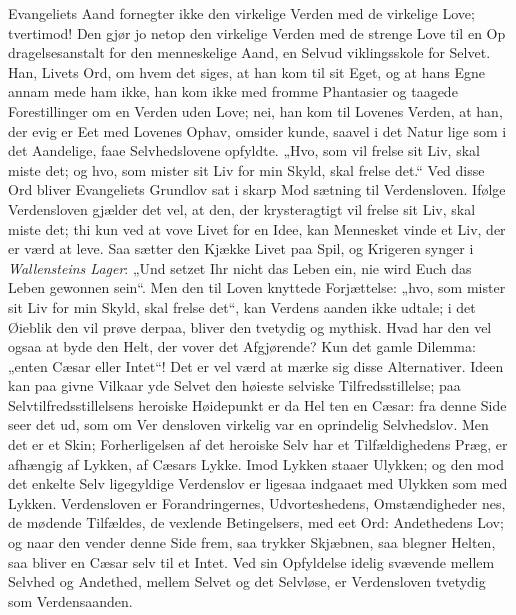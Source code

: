 \documentclass[12pt]{book}
\newcommand{\opage}[1]{\marginnote{\footnotesize\textit{[#1]}}}
\begin{document}
Evangeliets Aand fornegter ikke den virkelige Verden
med de virkelige Love; tvertimod! Den gjør jo netop
den virkelige Verden med de strenge Love til en Op\-%
dragelsesanstalt for den menneskelige Aand, en Selvud\-%
viklingsskole for Selvet. Han, Livets Ord, om hvem det
siges, at han kom til sit Eget, og at hans Egne annam\-%
mede ham ikke, han kom ikke med fromme Phantasier
og taagede Forestillinger om en Verden uden Love; nei,
\opage{44}\setcounter{footnote}{0}%
han kom til Lovenes Verden, at han, der evig er Eet
med Lovenes Ophav, omsider kunde, saavel i det Natur\-%
lige som i det Aandelige, faae Selvhedslovene opfyldte.
„Hvo, som vil frelse sit Liv, skal miste det; og hvo, som
mister sit Liv for min Skyld, skal frelse det.“ Ved
disse Ord bliver Evangeliets Grundlov sat i skarp Mod\-%
sætning til Verdensloven. Ifølge Verdensloven gjælder
det vel, at den, der krysteragtigt vil frelse sit Liv, skal
miste det; thi kun ved at vove Livet for en Idee, kan
Mennesket vinde et Liv, der er værd at leve. Saa sætter
den Kjække Livet paa Spil, og Krigeren synger i
\textit{Wallensteins Lager}: „Und setzet Ihr nicht das Leben
ein, nie wird Euch das Leben gewonnen sein“. Men
den til Loven knyttede Forjættelse: „hvo, som mister
sit Liv for min Skyld, skal frelse det“, kan Verdens\-%
aanden ikke udtale; i det Øieblik den vil prøve derpaa,
bliver den tvetydig og mythisk. Hvad har den vel ogsaa
at byde den Helt, der vover det Afgjørende? Kun det
gamle Dilemma: „enten Cæsar eller Intet“! Det er vel
værd at mærke sig disse Alternativer. Ideen kan paa givne
Vilkaar yde Selvet den høieste selviske Tilfredsstillelse;
paa Selvtilfredsstillelsens heroiske Høidepunkt er da Hel\-%
ten en Cæsar: fra denne Side seer det ud, som om Ver\-%
densloven virkelig var en oprindelig Selvhedslov. Men
det er et Skin; Forherligelsen af det heroiske Selv har
et Tilfældighedens Præg, er afhængig af Lykken, af
Cæsars Lykke. Imod Lykken staaer Ulykken; og den
mod det enkelte Selv ligegyldige Verdenslov er ligesaa
indgaaet med Ulykken som med Lykken. Verdensloven
er Forandringernes, Udvorteshedens, Omstændigheder\-%
nes, de mødende Tilfældes, de vexlende Betingelsers,
med eet Ord: Andethedens Lov; og naar den vender
denne Side frem, saa trykker Skjæbnen, saa blegner
Helten, saa bliver en Cæsar selv til et Intet. Ved sin
\opage{45}\setcounter{footnote}{0}%
Opfyldelse idelig svævende mellem Selvhed og Andethed,
mellem Selvet og det Selvløse, er Verdensloven tvetydig
som Verdensaanden.
\end{document}
